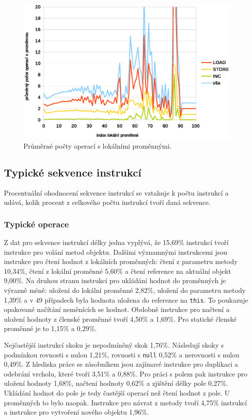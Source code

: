 \begin{figure}[h!]
\centering
\includegraphics[scale=0.9]{fig/locals} 
\caption{Průměrné počty operací s lokálními proměnnými.}\label{vars}
\end{figure}

\subsection{Typické sekvence instrukcí}

Procentuální ohodnocení sekvence instrukcí se vztahuje k počtu instrukcí a udává, kolik procent z celkového počtu instrukcí tvoří daná sekvence. 

\subsubsection{Typické operace}

Z dat pro sekvence instrukcí délky jedna vyplývá, že 15,69\% instrukcí tvoří instrukce pro volání metod objektu. 
Dalšími významnými instrukcemi jsou instrukce pro čtení hodnot z lokálních proměnných: čtení z parametru metody 10,34\%, čtení z lokální proměnné 5,60\% a čtení reference na aktuální objekt 9,00\%. Na druhou stranu instrukcí pro ukládání hodnot do proměnných je výrazně méně: uložení do lokální proměnné 2,82\%, uložení do parametru metody 1,39\% a v 49 případech byla hodnota uložena do reference na \texttt{this}. To poukazuje opakované načítání neměnících se hodnot. Obdobně instrukce pro načtení a uložení hodnoty z členské proměnné tvoří 4,50\% a 1,69\%. Pro statické členské proměnné je to 1,15\% a 0,29\%. 

Nejčastější instrukcí skoku je nepodmíněný skok 1,76\%. Následují skoky s podmínkou rovnosti s nulou 1,21\%, rovnosti s \texttt{null} 0,52\% a nerovnosti s nulou 0,49\%. Z hlediska práce se zásobníkem jsou zajímavé instrukce pro duplikaci a odebrání vrcholu, které tvoří 3,51\% a 0,88\%. Pro práci s polem pak instrukce pro uložení hodnoty 1,68\%, načtení hodnoty 0,62\% a zjištění délky pole 0,27\%. Ukládání hodnot do pole je tedy častější operací než čtení hodnot z pole. U proměnných to bylo naopak. Instrukce pro návrat z metody tvoří 4,75\% instrukcí a instrukce pro vytvoření nového objektu 1,96\%.

